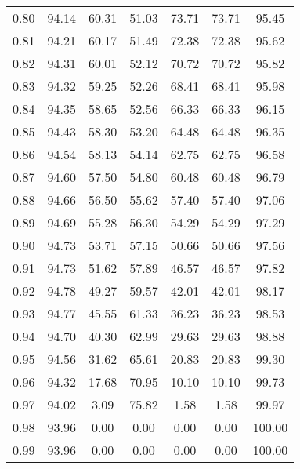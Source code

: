\begin{tabular}{|c|c|c|c|c|c|c|}
      0.80 &     94.14 &     60.31 &      51.03 &   73.71 &      73.71 &         95.45 \\
      0.81 &     94.21 &     60.17 &      51.49 &   72.38 &      72.38 &         95.62 \\
      0.82 &     94.31 &     60.01 &      52.12 &   70.72 &      70.72 &         95.82 \\
      0.83 &     94.32 &     59.25 &      52.26 &   68.41 &      68.41 &         95.98 \\
      0.84 &     94.35 &     58.65 &      52.56 &   66.33 &      66.33 &         96.15 \\
      0.85 &     94.43 &     58.30 &      53.20 &   64.48 &      64.48 &         96.35 \\
      0.86 &     94.54 &     58.13 &      54.14 &   62.75 &      62.75 &         96.58 \\
      0.87 &     94.60 &     57.50 &      54.80 &   60.48 &      60.48 &         96.79 \\
      0.88 &     94.66 &     56.50 &      55.62 &   57.40 &      57.40 &         97.06 \\
      0.89 &     94.69 &     55.28 &      56.30 &   54.29 &      54.29 &         97.29 \\
      0.90 &     94.73 &     53.71 &      57.15 &   50.66 &      50.66 &         97.56 \\
      0.91 &     94.73 &     51.62 &      57.89 &   46.57 &      46.57 &         97.82 \\
      0.92 &     94.78 &     49.27 &      59.57 &   42.01 &      42.01 &         98.17 \\
      0.93 &     94.77 &     45.55 &      61.33 &   36.23 &      36.23 &         98.53 \\
      0.94 &     94.70 &     40.30 &      62.99 &   29.63 &      29.63 &         98.88 \\
      0.95 &     94.56 &     31.62 &      65.61 &   20.83 &      20.83 &         99.30 \\
      0.96 &     94.32 &     17.68 &      70.95 &   10.10 &      10.10 &         99.73 \\
      0.97 &     94.02 &      3.09 &      75.82 &    1.58 &       1.58 &         99.97 \\
      0.98 &     93.96 &      0.00 &       0.00 &    0.00 &       0.00 &        100.00 \\
      0.99 &     93.96 &      0.00 &       0.00 &    0.00 &       0.00 &        100.00 \\
\bottomrule
\end{tabular}
